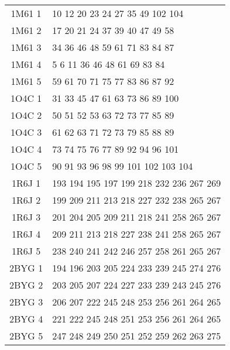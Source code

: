 \begin{table}[!htbp]
\begin{tabular}{cl}
    1M61 1  & 10 12 20 23 24 27 35 49 102 104 \\
    1M61 2  & 17 20 21 24 37 39 40 47 49 58 \\
    1M61 3  & 34 36 46 48 59 61 71 83 84 87 \\
    1M61 4  & 5 6 11 36 46 48 61 69 83 84 \\
    1M61 5  & 59 61 70 71 75 77 83 86 87 92 \\
    1O4C 1  & 31 33 45 47 61 63 73 86 89 100 \\
    1O4C 2  & 50 51 52 53 63 72 73 77 85 89 \\
    1O4C 3  & 61 62 63 71 72 73 79 85 88 89 \\
    1O4C 4  & 73 74 75 76 77 89 92 94 96 101 \\
    1O4C 5  & 90 91 93 96 98 99 101 102 103 104 \\
    1R6J 1  & 193 194 195 197 199 218 232 236 267 269 \\
    1R6J 2  & 199 209 211 213 218 227 232 238 265 267 \\
    1R6J 3  & 201 204 205 209 211 218 241 258 265 267 \\
    1R6J 4  & 209 211 213 218 227 238 241 258 265 267 \\
    1R6J 5  & 238 240 241 242 246 257 258 261 265 267 \\
    2BYG 1  & 194 196 203 205 224 233 239 245 274 276 \\
    2BYG 2  & 203 205 207 224 227 233 239 243 245 276 \\
    2BYG 3  & 206 207 222 245 248 253 256 261 264 265 \\
    2BYG 4  & 221 222 245 248 251 253 256 261 264 265 \\
    2BYG 5  & 247 248 249 250 251 252 259 262 263 275 \\
    
    \bottomrule
    
  \end{tabular}
\label{tab:select10}      
    \end{table}


